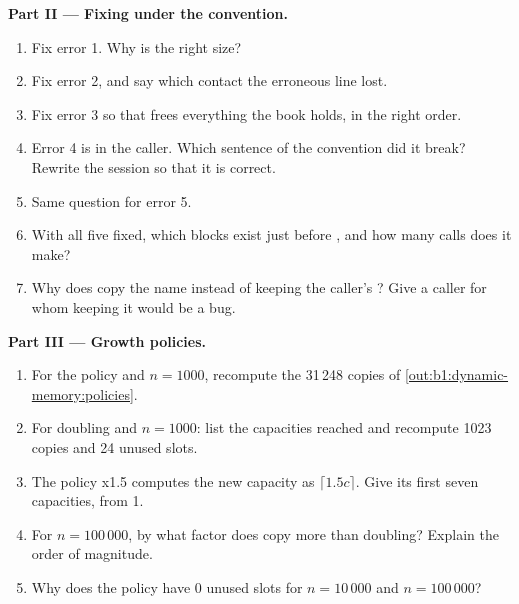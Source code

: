 \begin{problem}
\medskip\noindent\textbf{Part II --- Fixing under the convention.}
\begin{enumerate}[resume]
\item Fix error 1. Why is  the right size?
\item Fix error 2, and say which contact the erroneous line lost.
\item Fix error 3 so that  frees everything the book holds, in the right order.
\item Error 4 is in the caller. Which sentence of the convention did it break? Rewrite the session so that it is
correct.
\item Same question for error 5.
\item With all five fixed, which blocks exist just before , and how many  calls does it
make?
\item Why does  copy the name instead of keeping the caller's ? Give a caller for whom keeping
it would be a bug.
\end{enumerate}

\medskip\noindent\textbf{Part III --- Growth policies.}
\begin{enumerate}[resume]
\item For the policy  and $n = 1000$, recompute the 31\,248 copies of \cref{out:b1:dynamic-memory:policies}.
\item For doubling and $n = 1000$: list the capacities reached and recompute 1023 copies and 24 unused slots.
\item The policy x1.5 computes the new capacity as $\lceil 1.5c \rceil$. Give its first seven capacities, from 1.
\item For $n = 100\,000$, by what factor does  copy more than doubling? Explain the order of magnitude.
\item Why does the policy  have 0 unused slots for $n = 10\,000$ and $n = 100\,000$?
\end{enumerate}


\end{problem}
